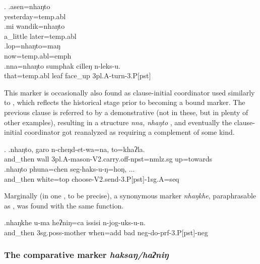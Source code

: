  \ex. \ag.asen=nhaŋto\\
 yesterday{\sc =temp.abl}\\
 \bg.mi wandik=nhaŋto\\
 a\_little later{\sc =temp.abl}\\
   \bg.lop=nhaŋto=maŋ\\
   now{\sc =temp.abl=emph}\\
\bg.nna=nhaŋto sumphak cilleŋ              n-leks-u.\\
that{\sc =temp.abl} leaf face\_up {\sc 3pl.A-}turn{\sc -3.P[pst]}\\
  


This marker is occasionally also found as clause-initial coordinator used similarly to \Next, which reflects the historical stage prior to becoming a bound marker.  The previous clause is referred to by a demonstrative (not in these, but in plenty of other examples), resulting in a structure \emph{nna, nhaŋto} , and eventually  the clause-initial coordinator got reanalyzed as requiring a complement of some kind.

\ex. \ag.nhaŋto, garo n-cheŋd-et-wa=na,    to=khaʔla.\\
and\_then wall {\sc 3pl.A-}mason{\sc -V2.carry.off-npst=nmlz.sg} up=towards\\
 
\bg.nhaŋto phuna=chen            seg-haks-u-ŋ=hoŋ, ...\\
and\_then white{\sc =top} choose{\sc -V2.send-3.P[pst]-1sg.A=seq}\\

Marginally (in one , to be precise),  a synonymous marker \emph{nhaŋkhe}, paraphrasable as , was found with the same function.

\exg.nhaŋkhe        u-ma              heʔniŋ=ca        issisi n-jog-uks-u-n.\\
and\_then {\sc 3sg.poss-}mother when{\sc =add} bad {\sc neg-}do{\sc -prf-3.P[pst]-neg}\\
 

\subsubsection{The comparative marker \emph{haksaŋ/haʔniŋ}}
  

